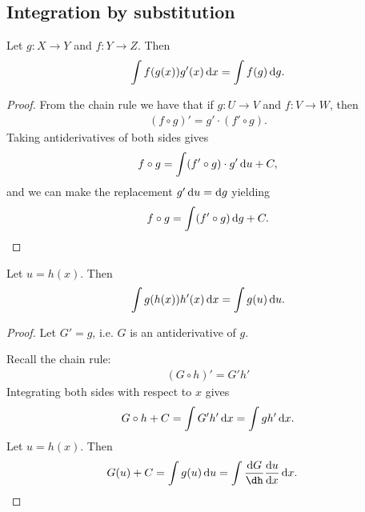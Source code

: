 \subsection{Integration by substitution}


\begin{theorem}
  Let $g:X \to Y$ and $f:Y \to Z$. Then
  \begin{align*}
    \int f(g(x)) g'(x) \dx = \int f(g) \dg.
  \end{align*}

\end{theorem}

\begin{proof}
  From the chain rule we have that if $g:U \to V$ and $f:V \to W$, then
  \begin{align*}
    (f \circ g)' = g' \cdot (f' \circ g).
  \end{align*}
  Taking antiderivatives of both sides gives
  \begin{align*}
    f \circ g = \int (f' \circ g) \cdot g' \du + C,
  \end{align*}
  and we can make the replacement $g'\du = \dg$ yielding
  \begin{align*}
    f \circ g = \int (f' \circ g) \dg + C.
  \end{align*}
\end{proof}


\begin{theorem*}
  Let $u = h(x)$. Then
  \begin{align*}
    \int g(h(x))h'(x) \dx = \int g(u) \du.
  \end{align*}
\end{theorem*}

\begin{proof}
  Let $G' = g$, i.e. $G$ is an antiderivative of $g$.

  Recall the chain rule:
  \begin{align*}
    (G \circ h)' = G' h'
  \end{align*}
  Integrating both sides with respect to $x$ gives
  \begin{align*}
    G \circ h + C = \int G' h' \dx = \int g h' \dx.
  \end{align*}
  Let $u = h(x)$. Then
  \begin{align*}
    G(u) + C &= \int g(u) \du
              = \int \frac{\dG}{\dh} \frac{\du}{\dx} \dx.
  \end{align*}
\end{proof}

